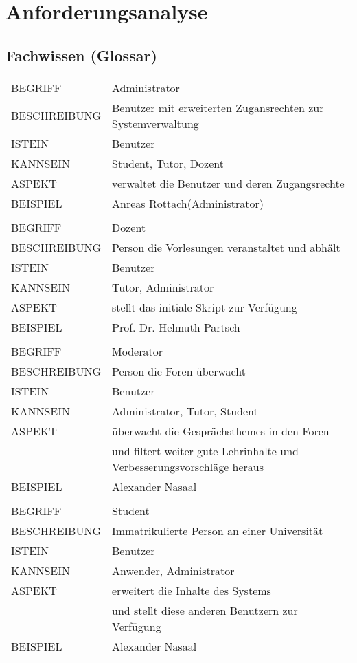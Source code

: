 \documentclass[12pt,a4paper]{article}
\begin{document}
\section{Anforderungsanalyse}
\subsection{Fachwissen (Glossar)}
\begin{tabular}{l p{10cm}}  
BEGRIFF 	 & Administrator \\ 
BESCHREIBUNG & Benutzer mit erweiterten Zugansrechten zur Systemverwaltung\\ 
ISTEIN   	 & Benutzer \\
KANNSEIN 	 & Student, Tutor, Dozent \\ 
ASPEKT   	 & verwaltet die Benutzer und deren Zugangsrechte\\
BEISPIEL 	 & Anreas Rottach(Administrator)\\
\hline 
&\\ 

BEGRIFF 	 & Dozent \\ 
BESCHREIBUNG & Person die Vorlesungen veranstaltet und abhält \\ 
ISTEIN   	 & Benutzer\\
KANNSEIN 	 & Tutor, Administrator \\ 
ASPEKT   	 & stellt das initiale Skript zur Verfügung\\
BEISPIEL 	 & Prof. Dr. Helmuth Partsch\\
\hline

&\\ 

BEGRIFF 	 & Moderator \\ 
BESCHREIBUNG & Person die Foren überwacht\\
ISTEIN   	 & Benutzer \\
KANNSEIN 	 & Administrator, Tutor, Student \\ 
ASPEKT   	 & überwacht die Gesprächsthemes in den Foren \\
 	     	 & und filtert weiter gute Lehrinhalte und Verbesserungsvorschläge heraus\\
BEISPIEL 	 & Alexander Nasaal\\
\hline

&\\ 

BEGRIFF 	 & Student \\ 
BESCHREIBUNG & Immatrikulierte Person an einer Universität \\ 
ISTEIN   	 & Benutzer \\
KANNSEIN 	 & Anwender, Administrator \\ 
ASPEKT   	 & erweitert die Inhalte des Systems\\
 	     	 & und stellt diese anderen Benutzern zur Verfügung \\
BEISPIEL 	 & Alexander Nasaal\\
\hline


\end{tabular}
\end{document}
